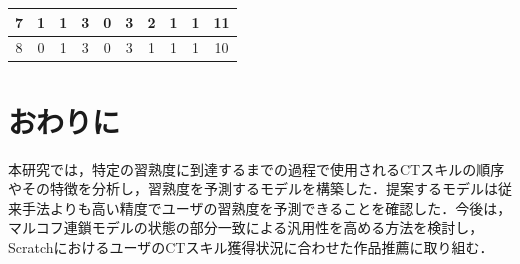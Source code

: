 \documentclass[submit,ses,noauthor]{ipsj}
\begin{document}
\begin{table}[t]
{\begin{tabular}{c|c|cccccccc}
7                   & 1                                           & \multicolumn{1}{c|}{1} & \multicolumn{1}{c|}{3} & \multicolumn{1}{c|}{0} & \multicolumn{1}{c|}{3} & \multicolumn{1}{c|}{2} & \multicolumn{1}{c|}{1} & \multicolumn{1}{c|}{1} & 11  \\ \hline
8                   & 0                                           & \multicolumn{1}{c|}{1} & \multicolumn{1}{c|}{3} & \multicolumn{1}{c|}{0} & \multicolumn{1}{c|}{3} & \multicolumn{1}{c|}{1} & \multicolumn{1}{c|}{1} & \multicolumn{1}{c|}{1} & 10  \\ \hline
\end{tabular}
}
  \end{table}




\section{おわりに}\label{sec:conc}

本研究では，特定の習熟度に到達するまでの過程で使用されるCTスキルの順序やその特徴を分析し，習熟度を予測するモデルを構築した．提案するモデルは従来手法よりも高い精度でユーザの習熟度を予測できることを確認した．今後は，マルコフ連鎖モデルの状態の部分一致による汎用性を高める方法を検討し，ScratchにおけるユーザのCTスキル獲得状況に合わせた作品推薦に取り組む．




\end{document}
